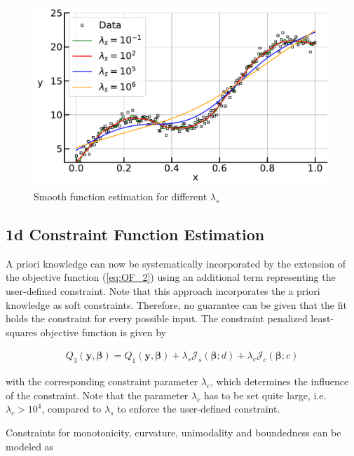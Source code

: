 \documentclass[10pt,a4paper]{article}
\begin{document}
	\begin{figure}[H]
		\centering
		\includegraphics[width=\linewidth]{../thesisplots/p_splines.pdf}
		\caption{Smooth function estimation for different $\lambda_s$}
		\label{fig:pspline}
	\end{figure}

	\subsection{1d Constraint Function Estimation}
	
	A priori knowledge can now be systematically incorporated by the extension of the objective function (\ref{eq:OF_2}) using an additional term representing the user-defined constraint. Note that this approach incorporates the a priori knowledge as soft constraints. Therefore, no guarantee can be given that the fit holds the constraint for every possible input. The constraint penalized least-squares objective function is given by
	
	\begin{align}\label{eq:OF_3}
		Q_3(\boldsymbol{y}, \boldsymbol{\beta}) = Q_1(\boldsymbol{y}, \boldsymbol{\beta}) + \lambda_s \mathcal{J}_s(\boldsymbol{\beta}; d) + \lambda_c \mathcal{J}_c(\boldsymbol{\beta}; c)
	\end{align}
	
	with the corresponding constraint parameter $\lambda_c$, which determines the influence of the constraint. Note that the parameter $\lambda_c$ has to be set quite large, i.e. $\lambda_c > 10^4$, compared to $\lambda_s$ to enforce the user-defined constraint. 
	
	Constraints for monotonicity, curvature, unimodality and boundedness can be modeled as 
	
\end{document}
